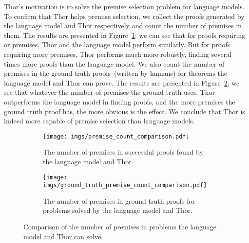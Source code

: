 \documentclass{article}
\begin{document}
Thor's motivation is to solve the premise selection problem for language models. To confirm that Thor helps premise selection, we collect the proofs generated by the language model and Thor respectively and count the number of premises in them. The results are presented in Figure~\ref{fig: success premise}: we can see that for proofs requiring  or  premises, Thor and the language model perform similarly. But for proofs requiring more premises, Thor performs much more robustly, finding several times more proofs than the language model. We also count the number of premises in the ground truth proofs~(written by humans) for theorems the language model and Thor can prove. The results are presented in Figure~\ref{fig: ground truth premise}: we see that whatever the number of premises the ground truth uses, Thor outperforms the language model in finding proofs, and the more premises the ground truth proof has, the more obvious is the effect. We conclude that Thor is indeed more capable of premise selection than language models.
\begin{figure}[t]
\begin{subfigure}{0.47\linewidth}
  \centering
  \texttt{[image: imgs/premise\_count\_comparison.pdf]}
    \caption{The number of premises in successful proofs found by the language model and Thor.}
    \label{fig: success premise}
\end{subfigure}
\hfill
\begin{subfigure}{0.47\linewidth}
  \centering
  \texttt{[image: imgs/ground\_truth\_premise\_count\_comparison.pdf]}
    \caption{The number of premises in ground truth proofs for problems solved by the language model and Thor.}
    \label{fig: ground truth premise}
\end{subfigure}
\caption{Comparison of the number of premises in problems the language model and Thor can solve.}
\label{fig: premise}
\end{figure}
\end{document}
